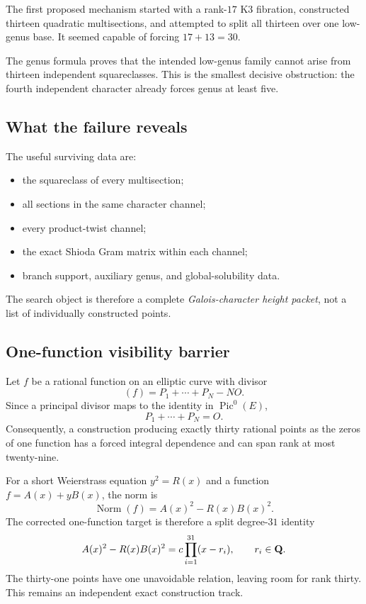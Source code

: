 The first proposed mechanism started with a rank-$17$ K3 fibration, constructed
thirteen quadratic multisections, and attempted to split all thirteen over one
low-genus base.  It seemed capable of forcing $17+13=30$.

The genus formula proves that the intended low-genus family cannot arise from
thirteen independent squareclasses.  This is the smallest decisive
obstruction: the fourth independent character already forces genus at least
five.

\subsection{What the failure reveals}

The useful surviving data are:
\begin{itemize}[leftmargin=*]
\item the squareclass of every multisection;
\item all sections in the same character channel;
\item every product-twist channel;
\item the exact Shioda Gram matrix within each channel;
\item branch support, auxiliary genus, and global-solubility data.
\end{itemize}
The search object is therefore a complete \emph{Galois-character height
packet}, not a list of individually constructed points.

\subsection{One-function visibility barrier}

Let $f$ be a rational function on an elliptic curve with divisor
\[
(f)=P_1+\cdots+P_N-NO.
\]
Since a principal divisor maps to the identity in $\operatorname{Pic}^0(E)$,
\[
\boxed{P_1+\cdots+P_N=O.}
\]
Consequently, a construction producing exactly thirty rational points as the
zeros of one function has a forced integral dependence and can span rank at
most twenty-nine.

For a short Weierstrass equation $y^2=R(x)$ and a function
$f=A(x)+yB(x)$, the norm is
\[
\operatorname{Norm}(f)=A(x)^2-R(x)B(x)^2.
\]
The corrected one-function target is therefore a split degree-$31$ identity
\[
A(x)^2-R(x)B(x)^2
=c\prod_{i=1}^{31}(x-r_i),
\qquad r_i\in\mathbf Q.
\]
The thirty-one points have one unavoidable relation, leaving room for rank
thirty.  This remains an independent exact construction track.
